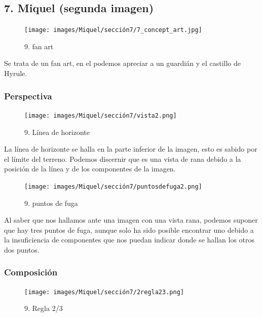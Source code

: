 \documentclass[12pt]{article}
\begin{document}

    \subsection{7. Miquel (segunda imagen)}
    \begin{figure}[H]
      \centering
      \texttt{[image: images/Miquel/sección7/7\_concept\_art.jpg]}
      \caption{\small 9. fan art}
    \end{figure}

    Se trata de un fan art, en el podemos apreciar a un guardián y el castillo de Hyrule.

        \subsubsection{Perspectiva}

    \begin{figure}[H]
      \centering
      \texttt{[image: images/Miquel/sección7/vista2.png]}
      \caption{\small 9. Línea de horizonte}
    \end{figure}

    La línea de horizonte se halla en la parte inferior de la imagen, esto es sabido por el límite del terreno. Podemos discernir que es una vista de rana debido a la posición de la línea y de los componentes de la imagen.
    
    \begin{figure}[H]
      \centering
      \texttt{[image: images/Miquel/sección7/puntosdefuga2.png]}
      \caption{\small 9. puntos de fuga}
    \end{figure}

    Al saber que nos hallamos ante una imagen con una vista rana, podemos suponer que hay tres puntos de fuga, aunque solo ha sido posible encontrar uno debido a la insuficiencia de componentes que nos puedan indicar donde se hallan los otros dos puntos.

        \subsubsection{Composición}
    \begin{figure}[H]
      \centering
      \texttt{[image: images/Miquel/sección7/2regla23.png]}
      \caption{\small 9. Regla 2/3}
    \end{figure}
    
\end{document}
